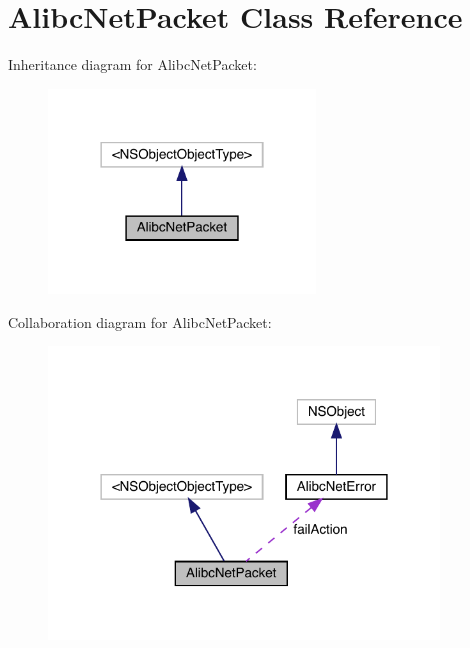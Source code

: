 \hypertarget{interface_alibc_net_packet}{}\section{Alibc\+Net\+Packet Class Reference}
\label{interface_alibc_net_packet}


Inheritance diagram for Alibc\+Net\+Packet\+:\nopagebreak
\begin{figure}[H]
\begin{center}
\leavevmode
\includegraphics[width=201pt]{interface_alibc_net_packet__inherit__graph}
\end{center}
\end{figure}


Collaboration diagram for Alibc\+Net\+Packet\+:\nopagebreak
\begin{figure}[H]
\begin{center}
\leavevmode
\includegraphics[width=294pt]{interface_alibc_net_packet__coll__graph}
\end{center}
\end{figure}
